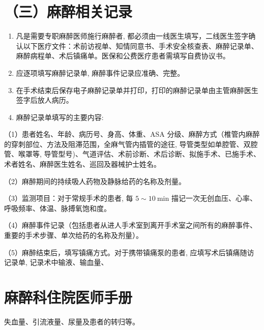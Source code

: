 \documentclass[10pt]{article}
\begin{document}
\section*{（三）麻醉相关记录}
\begin{enumerate}
  \item 凡是需要专职麻醉医师施行麻醉者, 都必须由一线医生填写，二线医生签字确认以下医疗文件：术前访视单、知情同意书、手术安全核查表、麻醉记录单、麻醉病程单、术后镇痛单。医保和公费医疗患者需填写自费协议书。

  \item 应逐项填写麻醉记录单, 麻醉事件记录应准确、完整。

  \item 在手术结束后保存电子麻醉记录单并打印，打印的麻醉记录单由主管麻醉医生签字后放人病历。

  \item 麻醉记录单填写的主要内容:

\end{enumerate}

（1）患者姓名、年龄、病历号、身高、体重、ASA 分级、麻醉方式（椎管内麻醉的穿刺部位、方法及阻滞范围，全麻气管内插管的途彺, 导管类型如单腔管、双腔管、喉罩等, 导管型号)、气道评估、术前诊断、术后诊断、拟施手术、已施手术、术者姓名、麻醉医生姓名、巡回及器械护士姓名。

（2）麻醉期间的持续吸人药物及静脉给药的名称及剂量。

（3）监测项目：对于常规手术的患者, 每 $5 \sim 10 \mathrm{~min}$ 描记一次无创血压、心率、呼吸频率、体温、脉搏氧饱和度。

（4）麻醉事件记录（包括患者从进人手术室到离开手术室之间所有的麻醉事件、重要的手术步骤、单次给药的名称及剂量）。

（5）麻醉结束后，填写镇痛方式。对于携带镇痛泵的患者, 应填写术后镇痛随访记录单, 记录术中输液、输血量、

\section*{麻醉科住院医师手册}
失血量、引流液量、尿量及患者的转归等。
\end{document}
